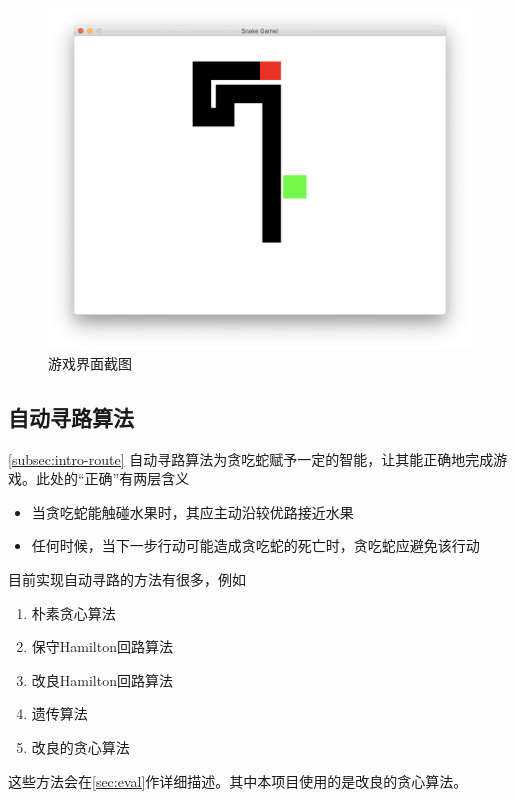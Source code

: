 \documentclass[a4paper]{article}
\begin{document}
\begin{figure}[!hbt]
    \begin{center}
    \includegraphics[scale=0.4]{assets/game.png}
    \caption{游戏界面截图\label{fig:game}} 
    \end{center} 
\end{figure} 

\subsection{自动寻路算法}\autoref{subsec:intro-route}
自动寻路算法为贪吃蛇赋予一定的智能，让其能正确地完成游戏。此处的``正确''有两层含义
\begin{itemize}
    \item 当贪吃蛇能触碰水果时，其应主动沿较优路接近水果
    \item 任何时候，当下一步行动可能造成贪吃蛇的死亡时，贪吃蛇应避免该行动
\end{itemize}
目前实现自动寻路的方法有很多，例如
\begin{enumerate} [label=(\alph*)]
    \item 朴素贪心算法
    \item 保守Hamilton回路算法
    \item 改良Hamilton回路算法
    \item 遗传算法
    \item 改良的贪心算法
\end{enumerate}
这些方法会在\autoref{sec:eval}作详细描述。其中本项目使用的是改良的贪心算法。\\
\end{document}
